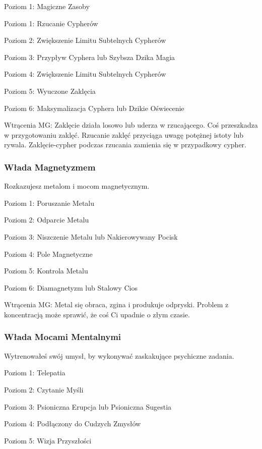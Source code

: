 Poziom 1: Magiczne Zasoby

Poziom 1: Rzucanie Cypherów

Poziom 2: Zwiększenie Limitu Subtelnych Cypherów

Poziom 3: Przypływ Cyphera lub Szybsza Dzika Magia

Poziom 4: Zwiększenie Limitu Subtelnych Cypherów

Poziom 5: Wyuczone Zaklęcia

Poziom 6: Maksymalizacja Cyphera lub Dzikie Oświecenie

Wtrącenia MG: Zaklęcie działa losowo lub uderza w rzucającego. Coś przeszkadza w przygotowaniu zaklęć. Rzucanie zaklęć przyciąga uwagę potężnej istoty lub rywala.  Zaklęcie-cypher podczas rzucania zamienia się w przypadkowy cypher. 

\subsubsection{Włada Magnetyzmem}

Rozkazujesz metalom i mocom magnetycznym.

Poziom 1: Poruszanie Metalu

Poziom 2: Odparcie Metalu

Poziom 3: Niszczenie Metalu lub Nakierowywany Pocisk

Poziom 4: Pole Magnetyczne

Poziom 5: Kontrola Metalu

Poziom 6: Diamagnetyzm lub Stalowy Cios

Wtrącenia MG: Metal się obraca, zgina i produkuje odpryski. Problem z koncentracją może sprawić, że coś Ci upadnie o złym czasie. 

\subsubsection{Włada Mocami Mentalnymi}

Wytrenowałeś swój umysł, by wykonywać zaskakujące psychiczne zadania. 

Poziom 1: Telepatia

Poziom 2: Czytanie Myśli

Poziom 3: Psioniczna Erupcja lub Psioniczna Sugestia

Poziom 4: Podłączony do Cudzych Zmysłów

Poziom 5: Wizja Przyszłości

